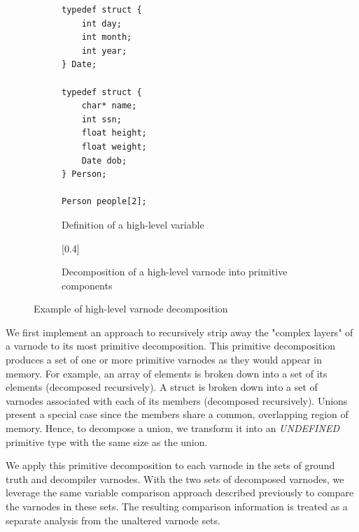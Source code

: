 \begin{figure}
    \begin{subfigure}[ht]{0.25\textwidth}
        \centering
        \begin{Verbatim}[frame=single]
typedef struct {
    int day;
    int month;
    int year;
} Date;

typedef struct {
    char* name;
    int ssn;
    float height;
    float weight;
    Date dob;
} Person;

Person people[2];
        \end{Verbatim}
        \caption{Definition of a high-level variable}
        \label{fig:decompose-src}
    \end{subfigure}
    \hfill
    \begin{subfigure}[hb]{0.75\textwidth}
        \scalebox{0.3}[0.4]{}
        \caption{Decomposition of a high-level varnode into primitive components}
        \label{fig:decompose-tree}
    \end{subfigure}
    \caption{Example of high-level varnode decomposition}
    \label{fig:decompose}
\end{figure}

We first implement an approach to recursively strip away the "complex layers" of a varnode to its most primitive decomposition. This primitive decomposition produces a set of one or more primitive varnodes as they would appear in memory. For example, an array of elements is broken down into a set of its elements (decomposed recursively). A struct is broken down into a set of varnodes associated with each of its members (decomposed recursively). Unions present a special case since the members share a common, overlapping region of memory. Hence, to decompose a union, we transform it into an \emph{UNDEFINED} primitive type with the same size as the union.

We apply this primitive decomposition to each varnode in the sets of ground truth and decompiler varnodes. With the two sets of decomposed varnodes, we leverage the same variable comparison approach described previously to compare the varnodes in these sets. The resulting comparison information is treated as a separate analysis from the unaltered varnode sets.

